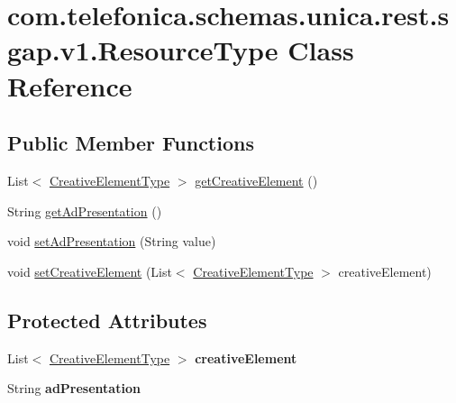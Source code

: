 \hypertarget{classcom_1_1telefonica_1_1schemas_1_1unica_1_1rest_1_1sgap_1_1v1_1_1ResourceType}{
\section{com.telefonica.schemas.unica.rest.sgap.v1.ResourceType Class Reference}
\label{classcom_1_1telefonica_1_1schemas_1_1unica_1_1rest_1_1sgap_1_1v1_1_1ResourceType}
}
\subsection*{Public Member Functions}
\begin{DoxyCompactItemize}
\item 
List$<$ \hyperlink{classcom_1_1telefonica_1_1schemas_1_1unica_1_1rest_1_1sgap_1_1v1_1_1CreativeElementType}{CreativeElementType} $>$ \hyperlink{classcom_1_1telefonica_1_1schemas_1_1unica_1_1rest_1_1sgap_1_1v1_1_1ResourceType_aa382757003f1d60213007273edd35f53}{getCreativeElement} ()
\item 
String \hyperlink{classcom_1_1telefonica_1_1schemas_1_1unica_1_1rest_1_1sgap_1_1v1_1_1ResourceType_a0e7b25685a22047aed6ec57c52db6b4c}{getAdPresentation} ()
\item 
void \hyperlink{classcom_1_1telefonica_1_1schemas_1_1unica_1_1rest_1_1sgap_1_1v1_1_1ResourceType_aeb070b98f9361ec5dfb0c796eacd6a44}{setAdPresentation} (String value)
\item 
void \hyperlink{classcom_1_1telefonica_1_1schemas_1_1unica_1_1rest_1_1sgap_1_1v1_1_1ResourceType_ab6472204f87ead68a72af9d20295b416}{setCreativeElement} (List$<$ \hyperlink{classcom_1_1telefonica_1_1schemas_1_1unica_1_1rest_1_1sgap_1_1v1_1_1CreativeElementType}{CreativeElementType} $>$ creativeElement)
\end{DoxyCompactItemize}
\subsection*{Protected Attributes}
\begin{DoxyCompactItemize}
\item 
\hypertarget{classcom_1_1telefonica_1_1schemas_1_1unica_1_1rest_1_1sgap_1_1v1_1_1ResourceType_a210426417fb80c9628fdb86a6e17d9fa}{
List$<$ \hyperlink{classcom_1_1telefonica_1_1schemas_1_1unica_1_1rest_1_1sgap_1_1v1_1_1CreativeElementType}{CreativeElementType} $>$ {\bfseries creativeElement}}
\label{classcom_1_1telefonica_1_1schemas_1_1unica_1_1rest_1_1sgap_1_1v1_1_1ResourceType_a210426417fb80c9628fdb86a6e17d9fa}

\item 
\hypertarget{classcom_1_1telefonica_1_1schemas_1_1unica_1_1rest_1_1sgap_1_1v1_1_1ResourceType_a6d6b85edd36a30f7475428350d6d09b9}{
String {\bfseries adPresentation}}
\label{classcom_1_1telefonica_1_1schemas_1_1unica_1_1rest_1_1sgap_1_1v1_1_1ResourceType_a6d6b85edd36a30f7475428350d6d09b9}

\end{DoxyCompactItemize}


